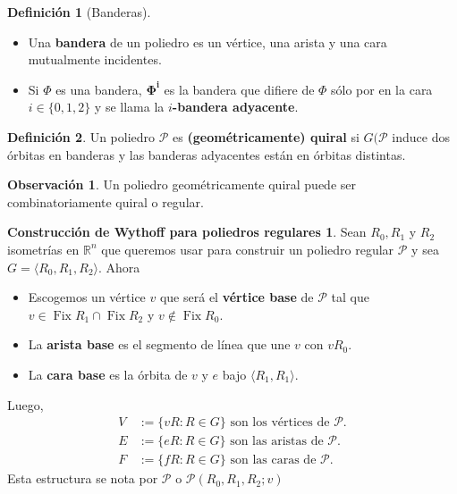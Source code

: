 \documentclass[spanish]{article}
\theoremstyle{definition}
\newtheorem*{defn}{Definición}
\newtheorem*{obs}{Observación}
\newtheorem*{Wreg}{Construcción de Wythoff para poliedros regulares}
\newcommand{\R}{\mathbb{R}}
\newcommand{\p}{\mathcal{P}}
\DeclareMathOperator{\Fix}{Fix}
\begin{document}
\begin{defn}[Banderas]
	\begin{itemize}
		\item 	Una \textbf{bandera} de un poliedro es un vértice, una arista y una cara mutualmente incidentes.
		\item Si $\Phi$ es una bandera, $\mathbf{\Phi^i}$ es la bandera que difiere de $\Phi$ sólo por en la cara $i\in\{0,1,2\}$ y se llama la $i$\textbf{-bandera adyacente}.
	\end{itemize}
\end{defn}

\begin{defn}
	Un poliedro $\mathcal{P}$ es \textbf{(geométricamente) quiral} si $G(\mathcal{P}$ induce dos órbitas en banderas y las banderas adyacentes están en órbitas distintas.
\end{defn}
\begin{obs}
	Un poliedro geométricamente quiral puede ser combinatoriamente quiral o regular.
\end{obs}

\begin{Wreg}Sean $R_0,R_1$ y $R_2$ isometrías en $\R^n$ que queremos usar para construir un poliedro regular $\p$  y sea $G=\langle R_0,R_1,R_2\rangle$. Ahora
\begin{itemize}
	\item Escogemos un vértice $v$ que será el \textbf{vértice base} de $\p$ tal que $v\in\Fix R_1\cap\Fix R_2$ y $v\notin\Fix R_0$.
	\item La \textbf{arista base} es el segmento de línea que une $v$ con $vR_0$.
	\item La \textbf{cara base} es la órbita de $v$ y $e$ bajo $\langle R_1,R_1\rangle$.
\end{itemize}
Luego,
\begin{align*}
	V&:=\{vR:R\in G\}\text{ son los vértices de } \p.\\ 
	E&:=\{eR:R\in G\} \text{ son las aristas de } \p.\\ 
	F&:=\{fR:R\in G\} \text{ son las caras de } \p.
\end{align*}
Esta estructura se nota por $\p$ o $\p(R_0,R_1,R_2;v)$
\end{Wreg}
\end{document}

